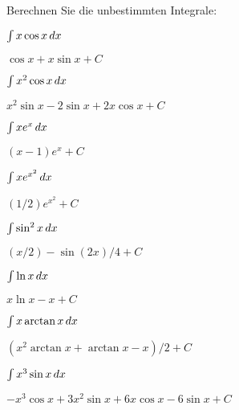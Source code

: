 \begin{exercises}
\noindent Berechnen Sie die unbestimmten Integrale:

\twocol

\begin{exercise} $\int x\cos x\, d x$
\begin{answer} $\cos x+x\sin x+C$
\end{answer}\end{exercise}

\begin{exercise} $\int x^2\cos x\, d x$
\begin{answer} $x^2\sin x-2 \sin x+2x\cos x +C$
\end{answer}\end{exercise}

\begin{exercise} $\int xe^x\, d x$
\begin{answer} $(x-1)e^x +C$
\end{answer}\end{exercise}

\begin{exercise} $\int xe^{x^2}\, d x$
\begin{answer} $(1/2)e^{x^2} +C$
\end{answer}\end{exercise}

\begin{exercise} $\int \sin^2 x\, d x$
\begin{answer} $(x/2)-\sin(2x)/4 +C$
\end{answer}\end{exercise}

\begin{exercise} $\int \ln x\, d x$
\begin{answer} $x\ln x-x +C$
\end{answer}\end{exercise}

\begin{exercise} $\int x\arctan x\, d x$
\begin{answer} $(x^2\arctan x +\arctan x -x)/2+C$
\end{answer}\end{exercise}

\begin{exercise} $\int x^3\sin x\, d x$
\begin{answer} $-x^3\cos x+3x^2\sin x+6x\cos x-6\sin x+C$
\end{answer}\end{exercise}


\end{exercises}
